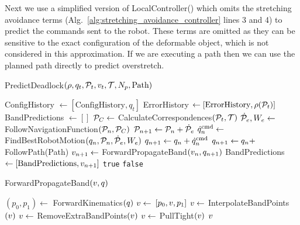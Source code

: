 Next we use a simplified version of LocalController() which omits the stretching avoidance terms (Alg.~\ref{alg:stretching_avoidance_controller} lines 3 and 4) to predict the commands sent to the robot. These terms are omitted as they can be sensitive to the exact configuration of the deformable object, which is not considered in this approximation. If we are executing a path then we can use the planned path directly to predict overstretch.

\begin{algorithm}[t]
\caption{PredictDeadlock$(\rho, q_t, \mathcal{P}_t, v_t, \mathcal{T}, N_p, \textrm{Path})$}
\begin{algorithmic}[1]
    \State ConfigHistory $\gets [\textrm{ConfigHistory}, q_t]$
    \State ErrorHistory $\gets [\textrm{ErrorHistory}, \rho(\mathcal{P}_t)]$
    \State BandPredictions $\gets []$
    \State $\mathcal{P}_C \gets$ CalculateCorrespondences$(\mathcal{P}_t, \mathcal{T})$
            \State $\dot{\mathcal{P}}_e, W_e \gets$ FollowNavigationFunction$(\mathcal{P}_n, \mathcal{P}_C)$
            \State $\mathcal{P}_{n + 1} \gets \mathcal{P}_n + \dot{\mathcal{P}}_e$
            \State $\dot{q}^{\textrm{cmd}}_n \gets$ FindBestRobotMotion$(q_n, \mathcal{P}_n, \dot{\mathcal{P}}_e, W_e)$
            \State $q_{n + 1} \gets q_n + \dot{q}^{\textrm{cmd}}_n$
        \Else
            \State $q_{n + 1} \gets q_n + $ FollowPath(Path)
        \EndIf
        \State $v_{n + 1} \gets$ ForwardPropagateBand$(v_n, q_{n + 1})$
        \State BandPredictions $\gets [\textrm{BandPredictions}, v_{n + 1}]$
    \EndFor
        \State \Return \texttt{true}
    \Else
        \State \Return \texttt{false}
    \EndIf
\end{algorithmic}
\label{alg:predict_deadlock}
\end{algorithm}


\begin{algorithm}[t]
\caption{ForwardPropagateBand$(v, q)$}
\begin{algorithmic}[1]
    \State $(p_0, p_1) \gets$ ForwardKinematics$(q)$
    \State $v \gets$ $[p_0, v, p_1]$
    \State $v \gets$ InterpolateBandPoints$(v)$
    \State $v \gets$ RemoveExtraBandPoints$(v)$
    \State $v \gets$ PullTight$(v)$
    \State \Return $v$
\end{algorithmic}
\label{alg:band_propogation}
\end{algorithm}





